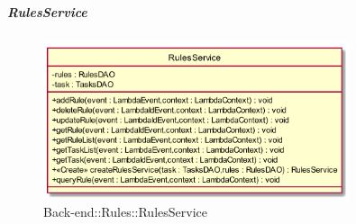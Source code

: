 \hypertarget{RulesService_label}{\subparagraph{RulesService}}
\begin{figure}[h]
	\centering
	\includegraphics[width=0.80\textwidth,height=\textheight,keepaspectratio]{images/ClassRulesService.png}
	\caption{Back-end::Rules::RulesService}
\end{figure}
